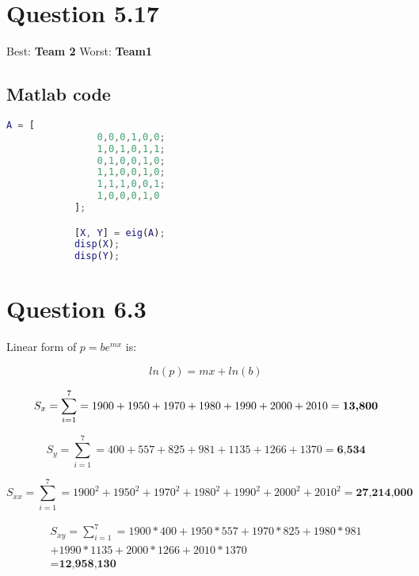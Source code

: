 \documentclass{article}
\begin{document}
    \section{Question 5.17}
        Best: \textbf{Team 2}   Worst: \textbf{Team1}

        \subsection{Matlab code}
        \begin{lstlisting}[language=Matlab]
            A = [
                0,0,0,1,0,0;
                1,0,1,0,1,1;
                0,1,0,0,1,0;
                1,1,0,0,1,0;
                1,1,1,0,0,1;
                1,0,0,0,1,0
            ];

            [X, Y] = eig(A);
            disp(X);
            disp(Y);
        \end{lstlisting}

    \section{Question 6.3}
        Linear form of $ p = be^{mx} $ is: 

        \begin{equation}
        ln(p)= mx + ln(b)
        \end{equation}

        \begin{equation}
            S_x = \sum\limits_{i=1}^7 = 1900 + 1950 + 1970 + 1980 + 1990 + 2000 + 2010 \break
                = \textbf{13,800}
        \end{equation}

        \begin{equation}
            S_y = \sum\limits_{i=1}^7 = 400 + 557 + 825 + 981 + 1135 + 1266 + 1370
                = \textbf{6,534}
        \end{equation}

        \begin{equation}
            S_{xx} = \sum\limits_{i=1}^7 = 1900^2 + 1950^2  + 1970^2  + 1980^2  + 1990^2  + 2000^2  + 2010^2 
                = \textbf{27,214,000}
        \end{equation}

        \begin{equation}
            \begin{aligned}
            S_{xy} = \sum\limits_{i=1}^7 = 1900*400 + 1950*557  + 1970*825  + 1980*981 \\  + 1990*1135  + 2000*1266  + 2010*1370 \\
                = \textbf{12,958,130}
            \end{aligned}
        \end{equation}
\end{document}
